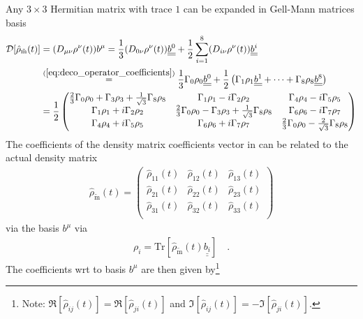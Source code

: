 Any $3 \times 3$ Hermitian matrix with trace $1$ can be expanded in Gell-Mann matrices basis
%
\begin{align} \label{eq:deco_operator_expansion}
   \mathcal{D}[\hat{\rho}_{\tilde{\text{m}}}(t)]
   &= (D_{\mu\nu}\rho^\nu(t))b^\mu
   =
   \frac{1}{3} (D_{0\nu}\rho^\nu(t)) \underline{\underline{b^0}} + \frac{1}{2} \sum_{i=1}^8 (D_{i\nu}\rho^\nu(t)) \underline{\underline{b^i}} \\
   &\overset{(\ref{eq:deco_operator_coefficients})}{=}
   \frac{1}{3} \Gamma_0\rho_0 \underline{\underline{b^0}} + \frac{1}{2} \left( \Gamma_1 \rho_1 \underline{\underline{b^1}} + \cdots + \Gamma_8 \rho_8 \underline{\underline{b^8}} \right) \\
   &= \frac{1}{2}
        \begin{pmatrix}
            \frac{2}{3}\Gamma_0 \rho_0 + \Gamma_3 \rho_3 + \frac{1}{\sqrt{3}} \Gamma_8 \rho_8  & \Gamma_1 \rho_1 - i \Gamma_2 \rho_2 & \Gamma_4 \rho_4 - i \Gamma_5 \rho_5 \\
            \Gamma_1 \rho_1 + i \Gamma_2 \rho_2 & \frac{2}{3}\Gamma_0 \rho_0 - \Gamma_3 \rho_3 + \frac{1}{\sqrt{3}} \Gamma_8 \rho_8  & \Gamma_6 \rho_6 - i \Gamma_7 \rho_7 \\
            \Gamma_4 \rho_4 + i \Gamma_5 \rho_5 & \Gamma_6 \rho_6 + i \Gamma_7 \rho_7 & \frac{2}{3}\Gamma_0 \rho_0 - \frac{2}{\sqrt{3}} \Gamma_8 \rho_8 \\
        \end{pmatrix}
\end{align}
%
The coefficients of the density matrix coefficients vector in  can be related to the actual density matrix
%
\begin{align} \label{eq:density_matrix}
   \hat{\rho}_{\tilde{\text{m}}}(t) = 
        \begin{pmatrix}
            \hat{\rho}_{11}(t) & \hat{\rho}_{12}(t) & \hat{\rho}_{13}(t) \\
            \hat{\rho}_{21}(t) & \hat{\rho}_{22}(t) & \hat{\rho}_{23}(t) \\
            \hat{\rho}_{31}(t) & \hat{\rho}_{32}(t) & \hat{\rho}_{33}(t) \\
        \end{pmatrix}
\end{align}
%
via the basis $b^\mu$ via
%
\begin{align} \label{eq:density_matrix_trace}
   \rho_i = \text{Tr}[\hat{\rho}_{\tilde{\text{m}}}(t) \underline{\underline{b_i}}] \quad \text{.}
\end{align}
%
The coefficients wrt to basis $b^\mu$ are then given by\footnote{Note: $\Re[\hat{\rho}_{ij}(t)] = \Re[\hat{\rho}_{ji}(t)]$ and $\Im[\hat{\rho}_{ij}(t)] = -\Im[\hat{\rho}_{ji}(t)]$.}

